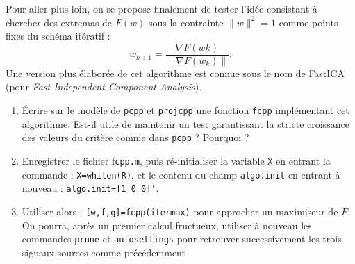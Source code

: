 \documentclass[10pt,a4paper,fleqn]{article}
\newcommand{\onit}{\begin{enumerate}}
\newcommand{\offit}{\end{enumerate}}
\newcommand{\grad}{\nabla}
\renewcommand{\tt}{\texttt}
\begin{document}
Pour aller plus loin, on se propose finalement de tester l'id\'{e}e consistant \`{a} chercher des
extremas de $F(w)$ sous la contrainte $\|w\|^2=1$ comme points fixes du sch\'ema it\'{e}ratif :
\[
w_{k+1}=\frac{\grad F(wk)}{\| \grad F(w_k)\|}.
\]
Une version plus \'{e}labor\'{e}e de cet algorithme est connue sous le nom de FastICA (pour \textit{Fast Independent Component Analysis}).
\onit
\item \'Ecrire sur le mod\`ele de \tt{pcpp} et \tt{projcpp} une fonction \tt{fcpp} impl\'{e}mentant cet algorithme. Est-il utile de maintenir un test garantissant la stricte croissance des valeurs du crit\`{e}re comme dans \tt{pcpp} ? Pourquoi ?
\item Enregistrer le fichier f\tt{cpp.m}, puis r\'e-initialiser la variable \tt X en entrant la commande : \tt{X=whiten(R)}, et le contenu du champ \tt{algo.init} en entrant \`{a} nouveau : \mbox{\tt{algo.init=[1 0 0]'}}.
\item Utiliser alors : \tt{[w,f,g]=fcpp(itermax)} pour approcher un maximiseur de $F$. On pourra, apr\`{e}s un premier calcul fructueux, utiliser \`{a} nouveau les commandes \tt{prune} et \tt{autosettings} pour retrouver successivement les trois signaux sources comme pr\'{e}c\'{e}demment
\offit
\end{document}
